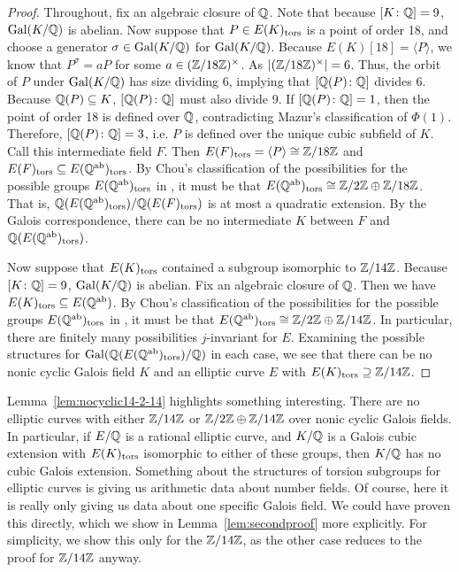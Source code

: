 \begin{proof}
Throughout, fix an algebraic closure of $\mathbb{Q}$. Note that because $[K \colon \mathbb{Q}]= 9$, $\operatorname{Gal}(K/\mathbb{Q})$ is abelian. Now suppose that $P \in E(K)_{\text{tors}}$ is a point of order 18, and choose a generator $\sigma \in \operatorname{Gal}(K/\mathbb{Q})$ for $\operatorname{Gal}(K/\mathbb{Q})$. Because $E(K)[18]= \langle P \rangle$, we know that $P^\sigma= aP$ for some $a \in (\mathbb{Z}/18\mathbb{Z})^\times$. As $|(\mathbb{Z}/18\mathbb{Z})^\times|= 6$. Thus, the orbit of $P$ under $\operatorname{Gal}(K/\mathbb{Q})$ has size dividing 6, implying that $[\mathbb{Q}(P) \colon \mathbb{Q}]$ divides 6. Because $\mathbb{Q}(P) \subseteq K$, $[\mathbb{Q}(P) \colon \mathbb{Q}]$ must also divide 9. If $[\mathbb{Q}(P) \colon \mathbb{Q}]= 1$, then the point of order 18 is defined over $\mathbb{Q}$, contradicting Mazur's classification of $\Phi(1)$. Therefore, $[\mathbb{Q}(P) \colon \mathbb{Q}]= 3$, i.e. $P$ is defined over the unique cubic subfield of $K$. Call this intermediate field $F$. Then $E(F)_{\text{tors}}= \langle P \rangle \cong \mathbb{Z}/18\mathbb{Z}$ and $E(F)_{\text{tors}} \subseteq E(\mathbb{Q}^{\text{ab}})_{\text{tors}}$. By Chou's classification of the possibilities for the possible groups $E(\mathbb{Q}^{\text{ab}})_{\text{tors}}$ in \cite{chou19}, it must be that $E(\mathbb{Q}^{\text{ab}})_{\text{tors}} \cong \mathbb{Z}/2\mathbb{Z} \oplus \mathbb{Z}/18\mathbb{Z}$. That is, $\mathbb{Q}(E(\mathbb{Q}^{\text{ab}})_{\text{tors}})/\mathbb{Q}(E(F)_{\text{tors}})$ is at most a quadratic extension. By the Galois correspondence, there can be no intermediate $K$ between $F$ and $\mathbb{Q}(E(\mathbb{Q}^{\text{ab}})_{\text{tors}})$. 

Now suppose that $E(K)_{\text{tors}}$ contained a subgroup isomorphic to $\mathbb{Z}/14\mathbb{Z}$. Because $[K \colon \mathbb{Q}]= 9$, $\operatorname{Gal}(K/\mathbb{Q})$ is abelian. Fix an algebraic closure of $\mathbb{Q}$. Then we have $E(K)_{\text{tors}} \subseteq E(\mathbb{Q}^{\text{ab}})$. By Chou's classification of the possibilities for the possible groups $E(\mathbb{Q}^{\text{ab}})_{\text{tors}}$ in \cite{chou19}, it must be that $E(\mathbb{Q}^{\text{ab}})_{\text{tors}} \cong \mathbb{Z}/2\mathbb{Z} \oplus \mathbb{Z}/14\mathbb{Z}$. In particular, there are finitely many possibilities $j$-invariant for $E$. Examining the possible structures for $\operatorname{Gal}(\mathbb{Q}(E(\mathbb{Q}^{\text{ab}})_{\text{tors}})/\mathbb{Q})$ in each case, we see that there can be no nonic cyclic Galois field $K$ and an elliptic curve $E$ with $E(K)_{\text{tors}} \supseteq \mathbb{Z}/14\mathbb{Z}$.  
\end{proof}


Lemma~\ref{lem:nocyclic14-2-14} highlights something interesting. There are no elliptic curves with either $\mathbb{Z}/14\mathbb{Z}$ or $\mathbb{Z}/2\mathbb{Z} \oplus \mathbb{Z}/14\mathbb{Z}$ over nonic cyclic Galois fields. In particular, if $E/\mathbb{Q}$ is a rational elliptic curve, and $K/\mathbb{Q}$ is a Galois cubic extension with $E(K)_{\text{tors}}$ isomorphic to either of these groups, then $K/\mathbb{Q}$ has no cubic Galois extension. Something about the structures of torsion subgroups for elliptic curves is giving us arithmetic data about number fields. Of course, here it is really only giving us data about one specific Galois field. We could have proven this directly, which we show in Lemma~\ref{lem:secondproof} more explicitly. For simplicity, we show this only for the $\mathbb{Z}/14\mathbb{Z}$, as the other case reduces to the proof for $\mathbb{Z}/14\mathbb{Z}$ anyway.


